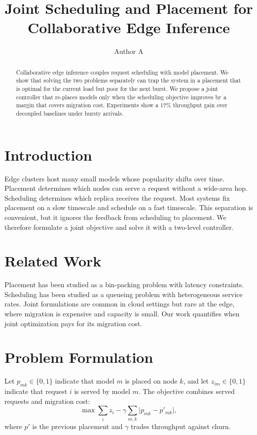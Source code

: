 \documentclass[conference]{IEEEtran}
\title{Joint Scheduling and Placement for Collaborative Edge Inference}
\author{Author A}
\begin{document}
\maketitle

\begin{abstract}
Collaborative edge inference couples request scheduling with model placement.
We show that solving the two problems separately can trap the system in a placement that is optimal for the current load but poor for the next burst.
We propose a joint controller that re-places models only when the scheduling objective improves by a margin that covers migration cost.
Experiments show a 17\% throughput gain over decoupled baselines under bursty arrivals.
\end{abstract}

\section{Introduction}
\label{sec:intro}
Edge clusters host many small models whose popularity shifts over time.
Placement determines which nodes can serve a request without a wide-area hop.
Scheduling determines which replica receives the request.
Most systems fix placement on a slow timescale and schedule on a fast timescale.
This separation is convenient, but it ignores the feedback from scheduling to placement.
We therefore formulate a joint objective and solve it with a two-level controller.

\section{Related Work}
\label{sec:related}
Placement has been studied as a bin-packing problem with latency constraints.
Scheduling has been studied as a queueing problem with heterogeneous service rates.
Joint formulations are common in cloud settings but rare at the edge, where migration is expensive and capacity is small.
Our work quantifies when joint optimization pays for its migration cost.

\section{Problem Formulation}
\label{sec:problem}
Let $p_{mk} \in \{0,1\}$ indicate that model $m$ is placed on node $k$, and let $z_{im} \in \{0,1\}$ indicate that request $i$ is served by model $m$.
The objective combines served requests and migration cost:
\begin{equation}
\label{eq:joint}
\max \sum_i z_i - \gamma \sum_{m,k} \lvert p_{mk} - p'_{mk} \rvert,
\end{equation}
where $p'$ is the previous placement and $\gamma$ trades throughput against churn.
\end{document}
